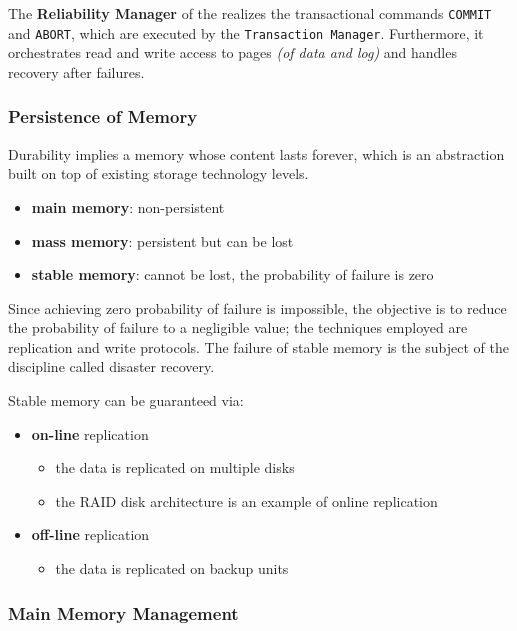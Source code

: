 \documentclass[english]{article}
\begin{document}
The \textbf{Reliability Manager} of the \dbms realizes the transactional commands \texttt{COMMIT} and \texttt{ABORT}, which are executed by the \texttt{Transaction Manager}.
Furthermore, it orchestrates read and write access to pages \textit{(of data and log)} and handles recovery after failures.

\subsubsection{Persistence of Memory}

Durability implies a memory whose content lasts forever, which is an abstraction built on top of existing storage technology levels.

\begin{itemize}
  \item \textbf{main memory}: non-persistent
  \item \textbf{mass memory}: persistent but can be lost
  \item \textbf{stable memory}: cannot be lost, the probability of failure is zero
\end{itemize}

Since achieving zero probability of failure is impossible, the objective is to reduce the probability of failure to a negligible value;
the techniques employed are replication and write protocols.
The failure of stable memory is the subject of the discipline called disaster recovery.

\bigskip
Stable memory can be guaranteed via:

\begin{itemize}
  \item \textbf{on-line} replication
        \begin{itemize}
          \item the data is replicated on multiple disks
          \item the RAID disk architecture is an example of online replication
        \end{itemize}
  \item \textbf{off-line} replication
        \begin{itemize}
          \item the data is replicated on backup units
        \end{itemize}
\end{itemize}

\subsubsection{Main Memory Management}
\end{document}
